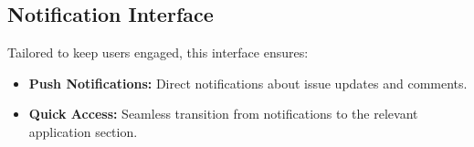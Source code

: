 \subsection{Notification Interface}
    Tailored to keep users engaged, this interface ensures:
    
    \begin{itemize}
        \item \textbf{Push Notifications:} Direct notifications about issue updates and comments.
        \item \textbf{Quick Access:} Seamless transition from notifications to the relevant application section.
    \end{itemize}

